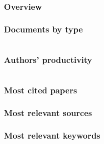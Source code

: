 \documentclass[aspectratio=169]{beamer}
\begin{document}
\begin{frame}
	\frametitle{Overview}
	\centering
	\small
	
\end{frame}

\begin{frame}
	\frametitle{Documents by type}
	\centering
	\small
	
\end{frame}

\begin{frame}
	\begin{columns}
		\begin{column}{0.5\textwidth}
			\frametitle{Authors' productivity}
			\centering
			\small
			
		\end{column}
		\begin{column}{0.5\textwidth}
			\centering
			\small
			
		\end{column}
	\end{columns}
\end{frame}

\begin{frame}
	\frametitle{Most cited papers}
	\centering
	\small
	
\end{frame}

\begin{frame}
	\frametitle{Most relevant sources}
	\centering
	\scriptsize
	
\end{frame}

\begin{frame}
	\frametitle{Most relevant keywords}
	\begin{columns}
		\begin{column}{0.5\textwidth}
			\centering
			\scriptsize
			
		\end{column}
		\begin{column}{0.5\textwidth}
			\centering
			\scriptsize
			
		\end{column}
	\end{columns}
\end{frame}
\end{document}
